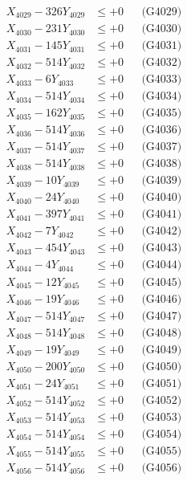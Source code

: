 \documentclass[a4paper,10pt]{article}
\begin{document}
{\begin{align}
X_{4029} - 326Y_{4029} &\leq +0 && \text{(G4029)} \\
X_{4030} - 231Y_{4030} &\leq +0 && \text{(G4030)} \\
\allowbreak
X_{4031} - 145Y_{4031} &\leq +0 && \text{(G4031)} \\
X_{4032} - 514Y_{4032} &\leq +0 && \text{(G4032)} \\
X_{4033} - 6Y_{4033} &\leq +0 && \text{(G4033)} \\
X_{4034} - 514Y_{4034} &\leq +0 && \text{(G4034)} \\
X_{4035} - 162Y_{4035} &\leq +0 && \text{(G4035)} \\
X_{4036} - 514Y_{4036} &\leq +0 && \text{(G4036)} \\
X_{4037} - 514Y_{4037} &\leq +0 && \text{(G4037)} \\
X_{4038} - 514Y_{4038} &\leq +0 && \text{(G4038)} \\
X_{4039} - 10Y_{4039} &\leq +0 && \text{(G4039)} \\
X_{4040} - 24Y_{4040} &\leq +0 && \text{(G4040)} \\
\allowbreak
X_{4041} - 397Y_{4041} &\leq +0 && \text{(G4041)} \\
X_{4042} - 7Y_{4042} &\leq +0 && \text{(G4042)} \\
X_{4043} - 454Y_{4043} &\leq +0 && \text{(G4043)} \\
X_{4044} - 4Y_{4044} &\leq +0 && \text{(G4044)} \\
X_{4045} - 12Y_{4045} &\leq +0 && \text{(G4045)} \\
X_{4046} - 19Y_{4046} &\leq +0 && \text{(G4046)} \\
X_{4047} - 514Y_{4047} &\leq +0 && \text{(G4047)} \\
X_{4048} - 514Y_{4048} &\leq +0 && \text{(G4048)} \\
X_{4049} - 19Y_{4049} &\leq +0 && \text{(G4049)} \\
X_{4050} - 200Y_{4050} &\leq +0 && \text{(G4050)} \\
\allowbreak
X_{4051} - 24Y_{4051} &\leq +0 && \text{(G4051)} \\
X_{4052} - 514Y_{4052} &\leq +0 && \text{(G4052)} \\
X_{4053} - 514Y_{4053} &\leq +0 && \text{(G4053)} \\
X_{4054} - 514Y_{4054} &\leq +0 && \text{(G4054)} \\
X_{4055} - 514Y_{4055} &\leq +0 && \text{(G4055)} \\
X_{4056} - 514Y_{4056} &\leq +0 && \text{(G4056)} \\

\end{align}}
\end{document}
